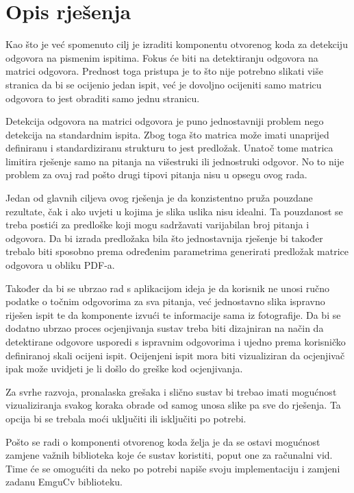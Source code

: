 \documentclass{foi}
\begin{document}
\section{Opis rješenja}

Kao što je već spomenuto cilj je izraditi komponentu otvorenog koda za detekciju odgovora na pismenim ispitima. Fokus će biti na detektiranju odgovora na matrici odgovora. Prednost toga pristupa je to što nije potrebno slikati više stranica da bi se ocijenio jedan ispit, već je dovoljno ocijeniti samo matricu odgovora to jest obraditi samo jednu stranicu. 

Detekcija odgovora na matrici odgovora je puno jednostavniji problem nego detekcija na standardnim ispita. Zbog toga što matrica može imati unaprijed definiranu i standardiziranu strukturu to jest predložak. Unatoč tome matrica limitira rješenje samo na pitanja na višestruki ili jednostruki odgovor. No to nije problem za ovaj rad pošto drugi tipovi pitanja nisu u opsegu ovog rada.

Jedan od glavnih ciljeva ovog rješenja je da konzistentno pruža pouzdane rezultate, čak i ako uvjeti u kojima je slika uslika nisu idealni. Ta pouzdanost se treba postići za predloške koji mogu sadržavati varijabilan broj pitanja i odgovora. Da bi izrada predložaka bila što jednostavnija rješenje bi također trebalo biti sposobno prema određenim parametrima generirati predložak matrice odgovora u obliku PDF-a. 

Također da bi se ubrzao rad s aplikacijom ideja je da korisnik ne unosi ručno podatke o točnim odgovorima za sva pitanja, već jednostavno slika ispravno riješen ispit te da komponente izvući te informacije sama iz fotografije. Da bi se dodatno ubrzao proces ocjenjivanja sustav treba biti dizajniran na način da detektirane odgovore usporedi s ispravnim odgovorima i ujedno prema korisničko definiranoj skali ocijeni ispit. Ocijenjeni ispit mora biti vizualiziran da ocjenjivač ipak može uvidjeti je li došlo do greške kod ocjenjivanja.

Za svrhe razvoja, pronalaska grešaka i slično sustav bi trebao imati mogućnost vizualiziranja svakog koraka obrade od samog unosa slike pa sve do rješenja. Ta opcija bi se trebala moći uključiti ili isključiti po potrebi. 

Pošto se radi o komponenti otvorenog koda želja je da se ostavi mogućnost zamjene važnih biblioteka koje će sustav koristiti, poput one za računalni vid. Time će se omogućiti da neko po potrebi napiše svoju implementaciju i zamjeni zadanu EmguCv biblioteku.
\end{document}
